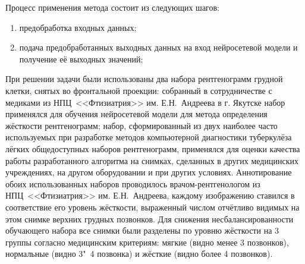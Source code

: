Процесс применения метода состоит из следующих шагов:
\begin{enumerate}[beginpenalty=10000]
	\item предобработка входных данных;
	\item подача предобработанных выходных данных на вход нейросетевой модели и получение её выходных значений;
\end{enumerate}

При решении задачи были использованы два набора рентгенограмм грудной клетки, снятых во фронтальной проекции: собранный в сотрудничестве с медиками из НПЦ~<<Фтизиатрия>> им. Е.Н.~Андреева в г. Якутске набор применялся для обучения нейросетевой модели для метода определения жёсткости рентгенограмм; набор, сформированный из двух наиболее часто используемых при разработке методов компьютерной диагностики туберкулёза лёгких общедоступных наборов рентгенограмм, применялся для оценки качества работы разработанного алгоритма на снимках, сделанных в других медицинских учреждениях, на другом оборудовании и при других условиях. Аннотирование обоих использованных наборов проводилось врачом-рентгенологом из НПЦ~<<Фтизиатрия>> им. Е.Н.~Андреева, каждому изображению ставился в соответствие его уровень жёсткости, выраженный числом отчётливо видимых на этом снимке верхних грудных позвонков. Для снижения несбалансированности обучающего набора все снимки были разделены по уровню жёсткости на 3 группы согласно медицинским критериям: мягкие (видно менее 3 позвонков), нормальные (видно 3"~4 позвонка) и жёсткие (видно более 4 позвонков).

